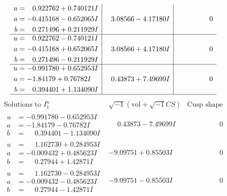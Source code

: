 \documentclass[1p]{elsarticle_modified}
\theoremstyle{definition}
\newcommand{\I}{\sqrt{-1}}
\begin{document}
$$\begin{array}{c|c|c}
\begin{aligned}
u &= \phantom{-}0.922762 + 0.740121 I \\
a &= -0.415168 - 0.652065 I \\
b &= \phantom{-}0.271496 + 0.211929 I\end{aligned}
 & \phantom{-}3.08566 - 4.17180 I & \phantom{-0.000000 } 0 \\ \hline\begin{aligned}
u &= \phantom{-}0.922762 - 0.740121 I \\
a &= -0.415168 + 0.652065 I \\
b &= \phantom{-}0.271496 - 0.211929 I\end{aligned}
 & \phantom{-}3.08566 + 4.17180 I & \phantom{-0.000000 } 0 \\ \hline\begin{aligned}
u &= -0.991780 + 0.652953 I \\
a &= -1.84179 + 0.76782 I \\
b &= \phantom{-}0.394401 + 1.134090 I\end{aligned}
 & \phantom{-}0.43873 + 7.49699 I & \phantom{-0.000000 } 0\\
 \hline 
 \end{array}$$\newpage$$\begin{array}{c|c|c}  
\text{Solutions to }I^u_{1}& \I (\text{vol} + \sqrt{-1}CS) & \text{Cusp shape}\\
 \hline 
\begin{aligned}
u &= -0.991780 - 0.652953 I \\
a &= -1.84179 - 0.76782 I \\
b &= \phantom{-}0.394401 - 1.134090 I\end{aligned}
 & \phantom{-}0.43873 - 7.49699 I & \phantom{-0.000000 } 0 \\ \hline\begin{aligned}
u &= \phantom{-}1.162730 + 0.284953 I \\
a &= -0.009432 + 0.485623 I \\
b &= \phantom{-}0.27944 + 1.42871 I\end{aligned}
 & -9.09751 + 0.85503 I & \phantom{-0.000000 } 0 \\ \hline\begin{aligned}
u &= \phantom{-}1.162730 - 0.284953 I \\
a &= -0.009432 - 0.485623 I \\
b &= \phantom{-}0.27944 - 1.42871 I\end{aligned}
 & -9.09751 - 0.85503 I & \phantom{-0.000000 } 0 \\ \hline\begin{aligned}

\end{aligned}
\end{array}$$
\end{document}
